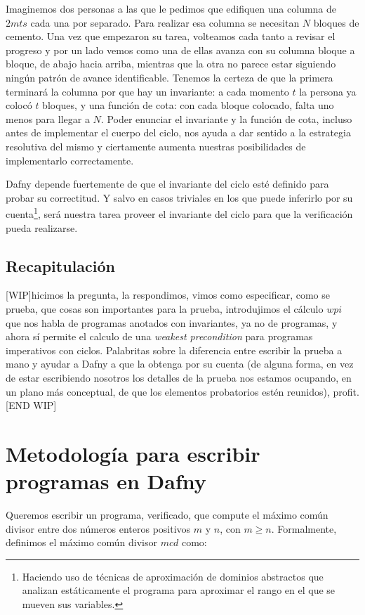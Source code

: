 \documentclass[12pt, a4paper, openany, fleqn]{book}
\newcommand{\wip}[1]{\begin{center} [WIP]#1[END WIP] \end{center}}
\begin{document}
    Imaginemos dos personas a las que le pedimos que edifiquen una columna de $2mts$ cada una por separado. Para realizar esa columna se necesitan $N$ bloques de cemento. Una vez que empezaron su tarea, volteamos cada tanto a revisar el progreso y por un lado vemos como una de ellas avanza con su columna bloque a bloque, de abajo hacia arriba, mientras que la otra no parece estar siguiendo ningún patrón de avance identificable. Tenemos la certeza de que la primera terminará la columna por que hay un invariante: a cada momento $t$ la persona ya colocó $t$ bloques, y una función de cota: con cada bloque colocado, falta uno menos para llegar a $N$.
    Poder enunciar el invariante y la función de cota, incluso antes de implementar el cuerpo del ciclo, nos ayuda a dar sentido a la estrategia resolutiva del mismo y ciertamente aumenta nuestras posibilidades de implementarlo correctamente.

    Dafny depende fuertemente de que el invariante del ciclo esté definido para probar su correctitud. Y salvo en casos triviales en los que puede inferirlo por su cuenta\footnote{Haciendo uso de técnicas de aproximación de dominios abstractos que analizan estáticamente el programa para aproximar el rango en el que se mueven sus variables.\cite{10.1007/11804192_17}}, será nuestra tarea proveer el invariante del ciclo para que la verificación pueda realizarse.

    \section{Recapitulación}
    \wip{hicimos la pregunta, la respondimos, vimos como especificar, como se prueba, que cosas son importantes para la prueba, introdujimos el cálculo $wpi$ que nos habla de programas anotados con invariantes, ya no de programas, y ahora sí permite el calculo de una \textit{ weakest precondition} para programas imperativos con ciclos. Palabritas sobre la diferencia entre escribir la prueba a mano y ayudar a Dafny a que la obtenga por su cuenta (de alguna forma, en vez de estar escribiendo nosotros los detalles de la prueba nos estamos ocupando, en un plano más conceptual, de que los elementos probatorios estén reunidos), profit.}

    \chapter{Metodología para escribir programas en Dafny}

    Queremos escribir un programa, verificado, que compute el máximo común divisor entre dos números enteros positivos $m$ y $n$,
    con $m \geqslant n$. Formalmente, definimos el máximo común divisor $mcd$ como:
\end{document}
